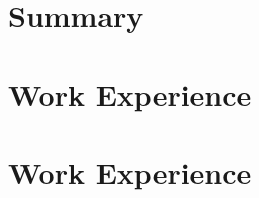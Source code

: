 \documentclass[a4paper]{twentysecondcv} %
\begin{document}

\makeprofile


\section{Summary}



\section{Work Experience}


\newpage
\makeprofiletwo

\section{Work Experience}

\end{document}

